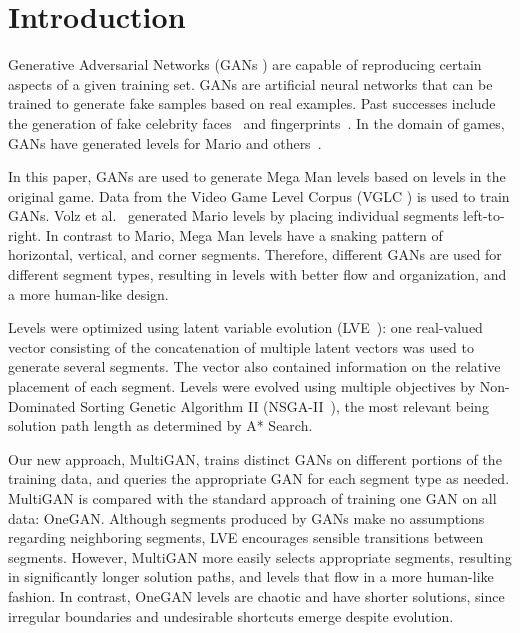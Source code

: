\section{Introduction}
Generative Adversarial Networks (GANs \cite{goodfellow2014generative}) are capable of reproducing certain aspects of a given training set. GANs are artificial neural networks that can be trained to generate fake samples based on real examples. Past successes include the generation of fake celebrity faces~\cite{karras:iclr2018} and fingerprints~\cite{bontrager2017deepmasterprint}. In the domain of games, GANs have generated levels for Mario and others~\cite{volz:gecco2018,gutierrez2020zeldagan,giacomello:cog19,torrado:cog20}. 

In this paper, GANs are used to generate Mega Man levels based on levels in the original game. Data from the Video Game Level Corpus (VGLC \cite{summerville:vglc2016}) is used to train GANs. Volz et al.~\cite{volz:gecco2018} generated Mario levels by placing individual segments left-to-right. In contrast to Mario, Mega Man levels have a snaking pattern of horizontal, vertical, and corner segments. 
Therefore, different GANs are used for different segment types, resulting in levels with better flow and organization, and a more human-like design. 

Levels were optimized using latent variable evolution (LVE~\cite{bontrager2018deep}): one real-valued vector consisting of the concatenation of multiple latent vectors was used to generate several segments. The vector also contained information on the relative placement of each segment. Levels were evolved using multiple objectives by Non-Dominated Sorting Genetic Algorithm II (NSGA-II~\cite{deb:tec02}), the most relevant being
solution path length as determined by A* Search. 




Our new approach, MultiGAN, trains distinct GANs on different portions of the training data, and queries the appropriate GAN for each segment type as needed.
MultiGAN is compared with the standard approach of training one GAN on all data: OneGAN.
Although segments produced by GANs make no assumptions regarding neighboring segments,
LVE encourages sensible transitions between segments. However, MultiGAN more easily selects appropriate segments, resulting in significantly longer solution paths, and levels that flow in a more human-like fashion. In contrast, OneGAN levels are chaotic and have shorter solutions, since irregular boundaries and undesirable shortcuts emerge despite evolution.

